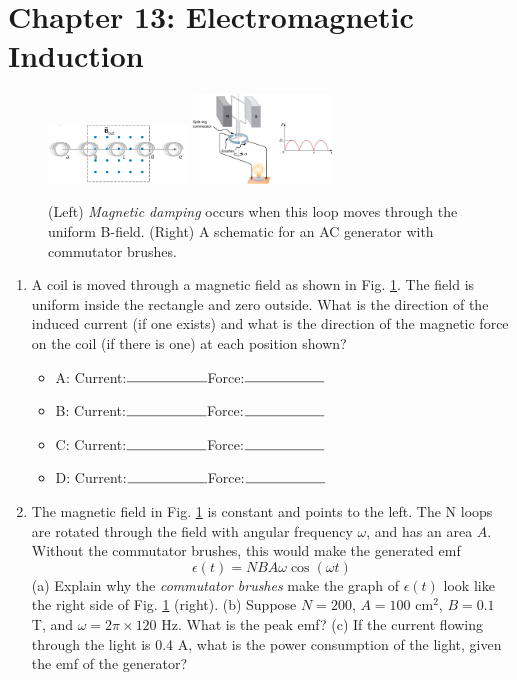 \documentclass[10pt]{article}
\begin{document}
\section{Chapter 13: Electromagnetic Induction}

\begin{figure}
\centering
\includegraphics[width=0.33\textwidth]{magdamp.png} \hspace{0.5cm}
\includegraphics[width=0.33\textwidth]{gen1.jpeg} 
\caption{\label{fig:chap13_1} (Left) \textit{Magnetic damping} occurs when this loop moves through the uniform B-field. (Right) A schematic for an AC generator with commutator brushes.}
\end{figure}

\begin{enumerate}
\item A coil is moved through a magnetic field as shown in Fig. \ref{fig:chap13_1}. The field is uniform inside the rectangle and zero outside. What is the direction of the induced current (if one exists) and what is the direction of the magnetic force on the coil (if there is one) at each position shown?
\begin{itemize}
\item A: Current:$\rule{2cm}{0.15mm}$Force:$\rule{2cm}{0.15mm}$
\item B: Current:$\rule{2cm}{0.15mm}$Force:$\rule{2cm}{0.15mm}$
\item C: Current:$\rule{2cm}{0.15mm}$Force:$\rule{2cm}{0.15mm}$
\item D: Current:$\rule{2cm}{0.15mm}$Force:$\rule{2cm}{0.15mm}$
\end{itemize}
\item The magnetic field in Fig. \ref{fig:chap13_1} is constant and points to the left.  The N loops are rotated through the field with angular frequency $\omega$, and has an area $A$.  Without the commutator brushes, this would make the generated emf
\begin{equation}
\epsilon(t) = N B A \omega \cos(\omega t)
\end{equation}
(a) Explain why the \textit{commutator brushes} make the graph of $\epsilon(t)$ look like the right side of Fig. \ref{fig:chap13_1} (right). (b) Suppose $N = 200$, $A = 100$ cm$^2$, $B = 0.1$ T, and $\omega = 2\pi \times 120$ Hz.  What is the peak emf? (c) If the current flowing through the light is 0.4 A, what is the power consumption of the light, given the emf of the generator? \\ \vspace{2cm}
\end{enumerate}
\end{document}

